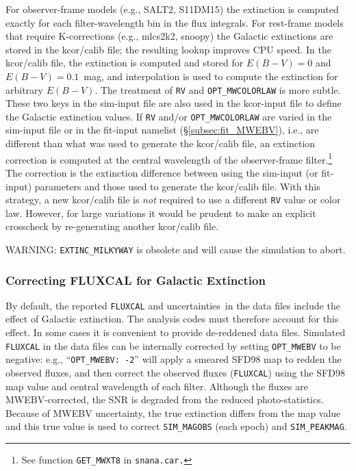 \documentclass[12pt]{article}
\newcommand{\unc}{uncertainty}
\newcommand{\uncs}{uncertainties}
\begin{document}
{For observer-frame models (e.g., SALT2, S11DM15) 
the extinction is computed exactly for each filter-wavelength 
bin in the flux integrals.
For rest-frame models that require K-corrections (e.g., mlcs2k2, snoopy) 
the Galactic extinctions are stored in the kcor/calib file;
the resulting lookup improves CPU speed. In the kcor/calib file, 
the extinction is computed and stored for 
$E(B-V)=0$ and $E(B-V)=0.1$~mag, and interpolation is used 
to compute the extinction for arbitrary $E(B-V)$.
The treatment of {\tt RV} and {\tt OPT\_MWCOLORLAW} is more subtle.
These two keys in the sim-input file are also used in the 
kcor-input file to define the Galactic extinction values.
If {\tt RV} and/or {\tt OPT\_MWCOLORLAW} are varied in the 
sim-input file or in the fit-input namelist (\S\ref{subsec:fit_MWEBV}),
i.e., are different than what was used to generate the kcor/calib file, 
an extinction correction is computed at the central wavelength 
of the observer-frame 
filter.\footnote{See function {\tt GET\_MWXT8} in {\tt snana.car.}}
The correction is the extinction difference between using the
sim-input (or fit-input) parameters and those used to generate 
the kcor/calib file.
With this strategy,  a new kcor/calib file is {\em not} required
to use a different {\tt RV} value or color law.
However, for large variations it would be prudent to make an 
explicit crosscheck by re-generating another kcor/calib file.


\bigskip
WARNING: {\tt EXTINC\_MILKYWAY} is obsolete and will cause the
simulation to abort.

\subsubsection{Correcting FLUXCAL for Galactic Extinction}
\label{sss:FLUXCOR_MWEBV}
By default, the reported {\tt FLUXCAL} and \uncs\ in the data
files include the effect of Galactic extinction. The analysis
codes must therefore account for this effect.
In some cases it is convenient to provide de-reddened data files. 
Simulated {\tt FLUXCAL} in the data files can be internally 
corrected by setting {\tt OPT\_MWEBV} to be negative:
e.g., ``{\tt OPT\_MWEBV: -2}'' will apply a smeared SFD98 map 
to redden the observed fluxes, and then correct the observed 
fluxes ({\tt FLUXCAL}) using the SFD98 map value and central
wavelength of each filter.
Although the fluxes are MWEBV-corrected, the SNR is degraded 
from the reduced photo-statistics.
Because of MWEBV \unc, the true extinction differs from the map value
and this true value is used to correct {\tt SIM\_MAGOBS} (each epoch)
and {\tt SIM\_PEAKMAG}.

}
\end{document}

